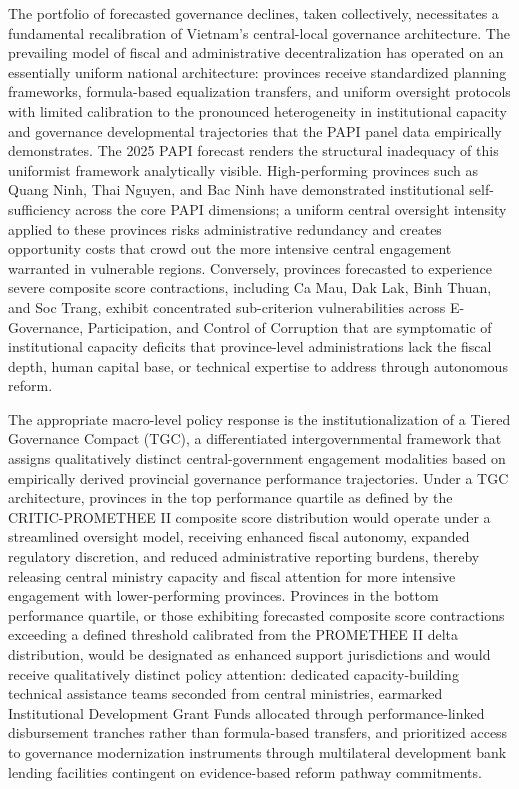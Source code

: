 \documentclass[12pt,a4paper]{article}
\begin{document}
The portfolio of forecasted governance declines, taken collectively, necessitates a fundamental recalibration of Vietnam's central-local governance architecture. The prevailing model of fiscal and administrative decentralization has operated on an essentially uniform national architecture: provinces receive standardized planning frameworks, formula-based equalization transfers, and uniform oversight protocols with limited calibration to the pronounced heterogeneity in institutional capacity and governance developmental trajectories that the PAPI panel data empirically demonstrates. The 2025 PAPI forecast renders the structural inadequacy of this uniformist framework analytically visible. High-performing provinces such as Quang Ninh, Thai Nguyen, and Bac Ninh have demonstrated institutional self-sufficiency across the core PAPI dimensions; a uniform central oversight intensity applied to these provinces risks administrative redundancy and creates opportunity costs that crowd out the more intensive central engagement warranted in vulnerable regions. Conversely, provinces forecasted to experience severe composite score contractions, including Ca Mau, Dak Lak, Binh Thuan, and Soc Trang, exhibit concentrated sub-criterion vulnerabilities across E-Governance, Participation, and Control of Corruption that are symptomatic of institutional capacity deficits that province-level administrations lack the fiscal depth, human capital base, or technical expertise to address through autonomous reform.

The appropriate macro-level policy response is the institutionalization of a Tiered Governance Compact (TGC), a differentiated intergovernmental framework that assigns qualitatively distinct central-government engagement modalities based on empirically derived provincial governance performance trajectories. Under a TGC architecture, provinces in the top performance quartile as defined by the CRITIC-PROMETHEE II composite score distribution would operate under a streamlined oversight model, receiving enhanced fiscal autonomy, expanded regulatory discretion, and reduced administrative reporting burdens, thereby releasing central ministry capacity and fiscal attention for more intensive engagement with lower-performing provinces. Provinces in the bottom performance quartile, or those exhibiting forecasted composite score contractions exceeding a defined threshold calibrated from the PROMETHEE II delta distribution, would be designated as enhanced support jurisdictions and would receive qualitatively distinct policy attention: dedicated capacity-building technical assistance teams seconded from central ministries, earmarked Institutional Development Grant Funds allocated through performance-linked disbursement tranches rather than formula-based transfers, and prioritized access to governance modernization instruments through multilateral development bank lending facilities contingent on evidence-based reform pathway commitments.
\end{document}
